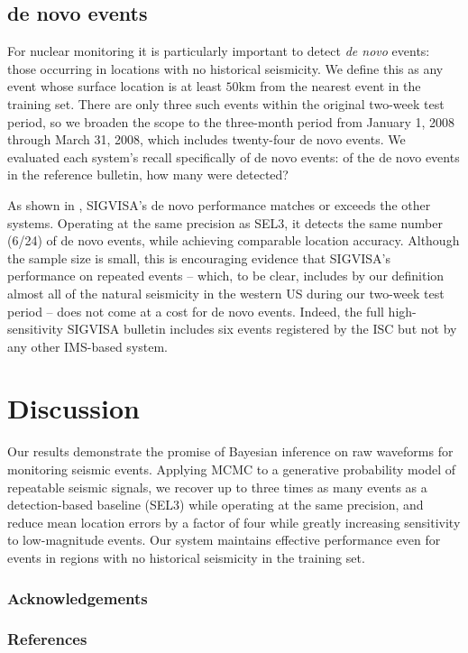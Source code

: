 \documentclass[twoside]{article} \usepackage{aistats2017}
\begin{document}
\subsection{de novo events}

For nuclear monitoring it is particularly important
to detect {\em de novo} events: those occurring in locations with no
historical seismicity. We define this as any event whose surface
location is at least $50$km from the
nearest event in the training set. There are only three such events
within the original two-week test period, so we broaden the scope to the
three-month period from January 1, 2008 through March 31, 2008, which
includes twenty-four de novo events. We evaluated each system's recall
specifically of de novo events: of the de novo events in the reference bulletin, how many were detected? 

As shown in , SIGVISA's de novo
performance matches or exceeds the other systems. Operating at the
same precision as SEL3, it detects the same number (6/24) of de novo 
events, while achieving comparable location accuracy. Although the
sample size is small, this is encouraging evidence that SIGVISA's
performance on repeated events -- which, to be clear, includes by our
definition almost all of the natural seismicity in the western US during our two-week
test period -- does not come at a cost for de novo events. Indeed,
the full high-sensitivity SIGVISA bulletin includes six events
registered by the ISC but not by any other IMS-based
system. 

\section{Discussion}

Our results demonstrate the promise of 
Bayesian inference on raw waveforms for monitoring seismic
events. Applying MCMC to a generative probability model of repeatable
seismic signals, we recover up to three times as many events as a
detection-based baseline (SEL3) while operating at the same precision,
and reduce mean location errors by a factor of four while greatly increasing
sensitivity to low-magnitude events. Our system maintains effective
performance even for events in regions with no historical seismicity
in the training set.




\subsubsection*{Acknowledgements}


\subsubsection*{References}



\end{document}
